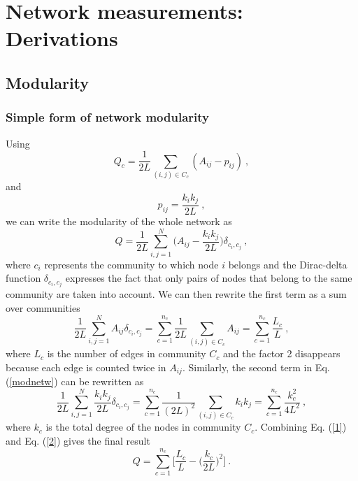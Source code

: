 \documentclass[11 pt , letterpaper , twoside , openright]{book}
\begin{document}
\pagestyle{fancy}
\fancyhf{}
\lhead{\textcolor{NavyBlue}{\appendixname} \ \textcolor{NavyBlue}{\thechapter}}
\rhead{\rightmark}
\cfoot{\thepage}

\appendix
\addappheadtotoc 

\chapter{Network measurements: Derivations}
\section{Modularity}\label{modul}
\subsection{Simple form of network modularity}\label{simplemod}

Using \cite{Albert2016}
\begin{equation}
	Q_c = \frac{1}{2L}\sum_{(i,j) \in C_c} (A_{ij} - p_{ij}) \ ,
\end{equation}
and \cite{Albert2016}
\begin{equation}
	p_{ij} = \frac{k_ik_j}{2L} \ ,
\end{equation}
we can write the modularity of the whole network as \cite{Albert2016}
\begin{equation}\label{modnetw}
	Q = \frac{1}{2L}\sum_{i, j = 1}^N \bigg(A_{ij} - \frac{k_ik_j}{2L}\bigg) \delta_{c_i, c_j} \ ,
\end{equation}
where $c_i$ represents the community to which node $i$ belongs and the Dirac-delta function $\delta_{c_i, c_j}$ expresses the fact that only pairs of nodes that belong to the same community are taken into account. We can then rewrite the first term as a sum over communities \cite{Albert2016}
\begin{equation}\label{1}
	\frac{1}{2L}\sum_{i, j = 1}^N A_{ij}\delta_{c_i, c_j} = \sum_{c=1}^{n_c}\frac{1}{2L}\sum_{(i, j) \in C_c} A_{ij} = \sum_{c=1}^{n_c}\frac{L_c}{L} \ ,
\end{equation}
where $L_c$ is the number of edges in community $C_c$ and the factor 2 disappears because each edge is counted twice in $A_{ij}$. Similarly, the second term in Eq. (\ref{modnetw}) can be rewritten as \cite{Albert2016}
\begin{equation}\label{2}
	\frac{1}{2L}\sum_{i, j = 1}^N \frac{k_ik_j}{2L} \delta_{c_i, c_j} = \sum_{c=1}^{n_c}\frac{1}{(2L)^2}\sum_{(i, j) \in C_c} k_ik_j = \sum_{c=1}^{n_c}\frac{k_c^2}{4L^2} \ ,
\end{equation}
where $k_c$ is the total degree of the nodes in community $C_c$. Combining Eq. (\ref{1}) and Eq. (\ref{2}) gives the final result \cite{Albert2016}
\begin{equation}\label{Qfin}
	Q = \sum_{c = 1}^{n_c}\bigg[\frac{L_c}{L} - \bigg(\frac{k_c}{2L}\bigg)^2 \bigg] \ .
\end{equation}
\end{document}
